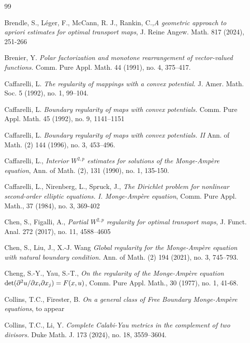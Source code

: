 \documentclass[12pt,reqno]{amsart}
\numberwithin{equation}{section}
\begin{document}
\begin{thebibliography}{99}

        Brendle, S., L\'eger, F., McCann, R. J.,              Rankin, C.,{\em A geometric approach to apriori estimates for optimal transport maps}, J. Reine Angew. Math. 817 (2024), 251-266

               Brenier, Y. {\em Polar factorization and monotone rearrangement of vector-valued functions.} Comm. Pure Appl. Math. 44 (1991), no. 4, 375–417.


		Caffarelli, L. {\em  The regularity of mappings with a convex potential.} J. Amer. Math. Soc. 5 (1992), no. 1, 99–104.
  
             Caffarelli, L. {\em Boundary regularity of maps with convex potentials.} Comm. Pure Appl. Math. 45 (1992), no. 9, 1141--1151

             Caffarelli, L. {\em Boundary regularity of maps with convex potentials. II} Ann. of Math. (2) 144 (1996), no. 3, 453–496.

             Caffarelli, L., {\em Interior {$W^{2,p}$} estimates for solutions of the
              {M}onge-{A}mp\`ere equation}, Ann. of Math. (2), 131 (1990), no. 1,  135-150.

               Caffarelli, L., Nirenberg, L., Spruck, J.,  {\em The {D}irichlet problem for nonlinear second-order elliptic
              equations. {I}. {M}onge-{A}mp\`ere equation}, Comm. Pure Appl. Math., 37 (1984), no. 3, 369-402
      

 Chen, S., Figalli, A., {\em Partial {$W^{2,p}$} regularity for optimal transport maps}, J. Funct. Anal. 272 (2017), no. 11, 4588--4605
            
		 Chen, S., Liu, J., X.-J. Wang {\em Global regularity for the Monge-Ampère equation with natural boundary condition.} Ann. of Math. (2) 194 (2021), no. 3, 745–793.

         Cheng, S.-Y., Yau, S.-T.,  {\em On the regularity of the {M}onge-{A}mp\`ere equation {${\rm det}(\partial \sp{2}u/\partial x\sb{i}\partial x\sb{j})=F(x,u)$}}, Comm. Pure Appl. Math., 30 (1977), no. 1, 41-68.

         Collins, T.C., Firester, B. {\em On a general class of Free Boundary Monge-Amp\`ere equations}, to appear

        Collins, T.C., Li, Y. {\em Complete Calabi-Yau metrics in the complement of two divisors.} Duke Math. J. 173 (2024), no. 18, 3559–3604.


\end{thebibliography}
\end{document}
